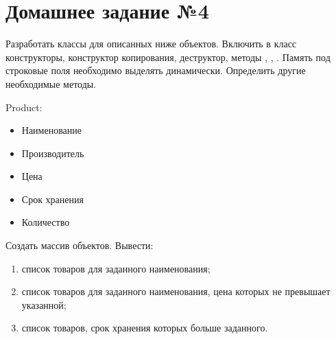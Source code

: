 \section*{Домашнее задание №4}

Разработать классы для описанных ниже объектов. Включить в класс
конструкторы, конструктор копирования, деструктор, методы ,
, . Память под строковые поля необходимо выделять
динамически. Определить другие необходимые методы.

Product:
\begin{itemize}
	\item Наименование
	\item Производитель
	\item Цена
	\item Срок хранения
	\item Количество
\end{itemize}

Создать массив объектов. Вывести:
\begin{enumerate}
	\item список товаров для заданного наименования;
	\item список товаров для заданного наименования, цена которых не превышает указанной;
	\item список товаров, срок хранения которых больше заданного.
\end{enumerate}
